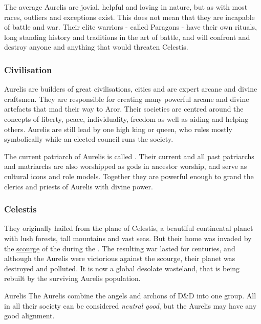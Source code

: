 The average Aurelis are jovial, helpful and loving in nature, but as with most
races, outliers and exceptions exist. This does not mean that they are
incapable of battle and war. Their elite warriors - called Paragons - have
their own rituals, long standing history and traditions in the art of battle,
and will confront and destroy anyone and anything that would threaten
Celestis.

\subsubsection{Civilisation}

Aurelis are builders of great civilisations, cities and are expert arcane and
divine craftsmen. They are responsible for creating many powerful arcane and
divine artefacts that mad their way to Aror. Their societies are centred
around the concepts of liberty, peace, individuality, freedom as well as
aiding and helping others. Aurelis are still lead by one high king or queen,
who rules mostly symbolically while an elected council runs the society.

The current patriarch of Aurelis is called . Their current
and all past patriarchs and matriarchs are also worshipped as gods in ancestor
worship, and serve as cultural icons and role models. Together they are
powerful enough to grand the clerics and priests of Aurelis with divine power.

\subsubsection{Celestis}
\label{sec:Celestis}

They originally hailed from the plane of Celestis, a beautiful continental
planet with lush forests, tall mountains and vast seas. But their home was
invaded by the \hyperref[sec:Scourge]{scourge} of the 
during the . The resulting war lasted for
centuries, and although the Aurelis were victorious against the scourge, their
planet was destroyed and polluted. It is now a global desolate wasteland, that
is being rebuilt by the surviving Aurelis population.

\begin{35e}{Aurelis}
  The Aurelis combine the angels and archons of D\&D into one group. All in all
  their society can be considered \emph{neutral good}, but the Aurelis may have
  any good alignment.
\end{35e}
